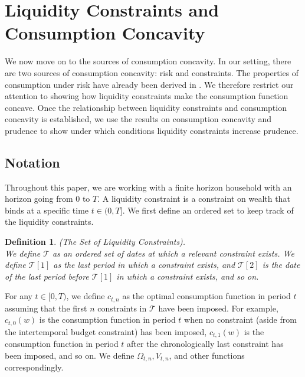 \documentclass[titlepage]{\econtex}
\newtheorem{defn}{Definition}
\begin{document}
\section{Liquidity Constraints and Consumption Concavity}\label{sec:Precaution} 

We now move on to the sources of consumption concavity. In our setting, there are two sources of consumption concavity: risk and constraints. The properties of consumption under risk have already been derived in \citet{carroll&kimball:concavity}. We therefore restrict our attention to showing how liquidity constraints make the consumption function concave. Once the relationship between liquidity constraints and consumption concavity is established, we use the results on consumption concavity and prudence to show under which conditions liquidity constraints increase prudence.

\subsection{Notation}
Throughout this paper, we are working with a finite horizon household with an horizon going from $0$ to $T$. A liquidity constraint is a constraint on wealth that binds at a specific time $t \in (0, T]$. We first define an ordered set to keep track of the liquidity constraints.
\begin{defn} (The Set of Liquidity Constraints). \\
	We define $\mathcal{T}$ as an ordered set of dates at which a relevant constraint exists. We define $\mathcal{T}[1]$ as the last period in which a constraint exists, and $\mathcal{T}[2]$ is the date of the last period before $\mathcal{T}[1]$ in which a constraint exists, and so on.
\end{defn}
For any $t \in [0, T)$, we define $c_{t,n}$ as the optimal consumption function in period $t$ assuming that the first $n$ constraints in $\mathcal{T}$ have been imposed. For example, $c_{t,0}(w)$ is the consumption function in period $t$ when no constraint (aside from the intertemporal budget constraint) has been imposed, $c_{t,1}(w)$ is the consumption function in period $t$ after the chronologically last constraint has been imposed, and so on. We define $\Omega_{t,n}, V_{t,n}$, and other functions correspondingly.
\end{document}
